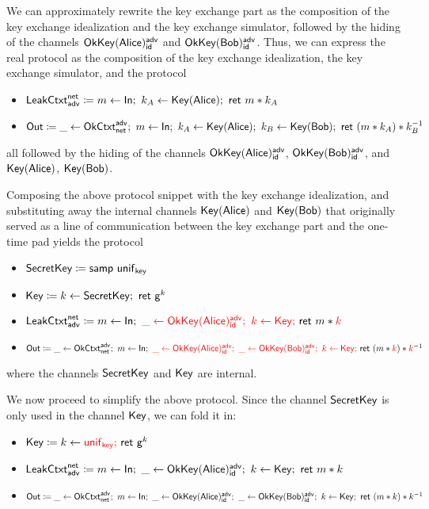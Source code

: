We can approximately rewrite the key exchange part as the composition of the key exchange idealization and the key exchange simulator, followed by the hiding of the channels $\mathsf{OkKey}(\mathsf{Alice})^{\mathsf{adv}}_{\mathsf{id}}$ and $\mathsf{OkKey}(\mathsf{Bob})^{\mathsf{adv}}_{\mathsf{id}}$. Thus, we can express the real protocol as the composition of the key exchange idealization, the key exchange simulator, and the protocol
\begin{itemize}
\item $\mathsf{LeakCtxt}^{\mathsf{net}}_{\mathsf{adv}} \coloneqq m \leftarrow \mathsf{In}; \ k_A \leftarrow \mathsf{Key}(\mathsf{Alice}); \ \mathsf{ret} \ m * k_A$
\item $\Out \coloneqq \_ \leftarrow \OkCtxt^\adv_\net; \ m \leftarrow \In; \ k_A \leftarrow \Key(\Alice); \ k_B \leftarrow \Key(\Bob); \ \ret{(m * k_A) * k_B^{-1}}$
\end{itemize}
all followed by the hiding of the channels $\mathsf{OkKey}(\mathsf{Alice})^{\mathsf{adv}}_{\mathsf{id}}$, $\mathsf{OkKey}(\mathsf{Bob})^{\mathsf{adv}}_{\mathsf{id}}$, and $\mathsf{Key}(\mathsf{Alice})$, $\mathsf{Key}(\mathsf{Bob})$.

Composing the above protocol snippet with the key exchange idealization, and substituting away the internal channels $\mathsf{Key}(\mathsf{Alice})$ and $\mathsf{Key}(\mathsf{Bob})$ that originally served as a line of communication between the key exchange part and the one-time pad yields the protocol
\begin{itemize}
\item $\mathsf{SecretKey} \coloneqq \mathsf{samp} \ \mathsf{unif}_{\mathsf{key}}$
\item $\mathsf{Key} \coloneqq k \leftarrow \mathsf{SecretKey}; \ \mathsf{ret} \ \mathsf{g}^k$
\item $\LeakCtxt^\net_\adv \coloneqq m \leftarrow \In; \ {\color{red} \_ \leftarrow \OkKey(\Alice)^\adv_\id; \ k \leftarrow \Key; \ } \ret{m * {\color{red} k}}$
\item $\mathsf{Out} \coloneqq \_ \leftarrow \mathsf{OkCtxt}^{\mathsf{adv}}_{\mathsf{net}}; \ m \leftarrow \mathsf{In}; \ {\color{red} \_ \leftarrow \mathsf{OkKey}(\mathsf{Alice})^{\mathsf{adv}}_{\mathsf{id}}; \ \_ \leftarrow \mathsf{OkKey}(\mathsf{Bob})^{\mathsf{adv}}_{\mathsf{id}}; \ k \leftarrow \mathsf{Key}; \ } \mathsf{ret} \ (m * {\color{red} k}) * {\color{red} k}^{-1}$
\end{itemize}
where the channels $\mathsf{SecretKey}$ and $\mathsf{Key}$ are internal.

We now proceed to simplify the above protocol. Since the channel $\mathsf{SecretKey}$ is only used in the channel $\mathsf{Key}$, we can fold it in:

\begin{itemize}
\item $\mathsf{Key} \coloneqq k \leftarrow {\color{red} \mathsf{unif}_{\mathsf{key}}; \ } \mathsf{ret} \ \mathsf{g}^k$
\item $\mathsf{LeakCtxt}^{\mathsf{net}}_{\mathsf{adv}} \coloneqq m \leftarrow \mathsf{In}; \ \_ \leftarrow \mathsf{OkKey}(\mathsf{Alice})^{\mathsf{adv}}_{\mathsf{id}}; \ k \leftarrow \mathsf{Key}; \ \mathsf{ret} \ m * k$
\item $\mathsf{Out} \coloneqq \_ \leftarrow \mathsf{OkCtxt}^{\mathsf{adv}}_{\mathsf{net}}; \ m \leftarrow \mathsf{In}; \ \_ \leftarrow \mathsf{OkKey}(\mathsf{Alice})^{\mathsf{adv}}_{\mathsf{id}}; \ \_ \leftarrow \mathsf{OkKey}(\mathsf{Bob})^{\mathsf{adv}}_{\mathsf{id}}; \ k \leftarrow \mathsf{Key}; \ \mathsf{ret} \ (m * k) * k^{-1}$
\end{itemize}

